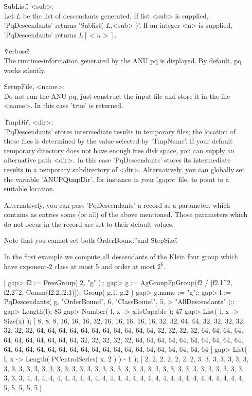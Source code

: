 \"SubList\", <sub>: \\
    Let $L$  be  the  list of  descendants  generated.  If  list <sub> is
    supplied,  'PqDescendants'  returns  'Sublist( $L$,<sub> )'.  If   an
    integer <n> is supplied, 'PqDescendants' returns $L[<n>]$.

\"Verbose\": \\
    The runtime-information  generated by  the  ANU pq is  displayed.  By
    default, pq works silently.

\"SetupFile\", <name>: \\
    Do not run the ANU pq, just construct  the input file and store it in
    the file <name>. In this case 'true' is returned.

\"TmpDir\", <dir>: \\
    'PqDescendants' stores intermediate results  in temporary  files; the
    location  of  these  files  is  determined  by the value  selected by
    'TmpName'.  If your default temporary directory does not  have enough
    free disk space,  you can supply an alternative path  <dir>.  In this
    case 'PqDescendants' stores its intermediate results  in  a temporary
    subdirectory of <dir>.
    Alternatively, you can globally set  the  variable 'ANUPQtmpDir', for
    instance in your \".gaprc\"\ file, to point to a suitable location.

Alternatively,  you can pass 'PqDescendants'  a record  as  a  parameter,
which  contains  as  entries some (or all) of the above mentioned.  Those
parameters  which do not occur  in  the record are  set  to their default
values.

Note that you cannot set both \"OrderBound\"\ and \"StepSize\".

In the first example  we  compute all descendants of the Klein four group
which have exponent-2 class at most 5 and order at most $2^6$.

|    gap> f2 := FreeGroup( 2, "g" );;
    gap> g := AgGroupFpGroup(f2 / [f2.1^2, f2.2^2, Comm(f2.2,f2.1)]);
    Group( g.1, g.2 )
    gap> g.name := "g";;
    gap> l := PqDescendants( g, "OrderBound", 6, "ClassBound", 5,
    >                        "AllDescendants" );;
    gap> Length(l);
    83
    gap> Number( l, x -> x.isCapable );
    47
    gap> List( l, x -> Size(x) );
    [ 8, 8, 8, 16, 16, 16, 32, 16, 16, 16, 16, 16, 32, 32, 64, 64, 32,
      32, 32, 32, 32, 32, 32, 64, 64, 64, 64, 64, 64, 64, 64, 64, 64, 64,
      32, 32, 32, 32, 64, 64, 64, 64, 64, 64, 64, 64, 64, 64, 64, 32, 32,
      32, 32, 32, 64, 64, 64, 64, 64, 64, 64, 64, 64, 64, 64, 64, 64, 64,
      64, 64, 64, 64, 64, 64, 64, 64, 64, 64, 64, 64, 64, 64, 64 ]
    gap> List( l, x -> Length( PCentralSeries( x, 2 ) ) - 1 );
    [ 2, 2, 2, 2, 2, 2, 2, 3, 3, 3, 3, 3, 3, 3, 3, 3, 3, 3, 3, 3, 3, 3,
      3, 3, 3, 3, 3, 3, 3, 3, 3, 3, 3, 3, 3, 3, 3, 3, 3, 3, 3, 3, 3, 3,
      3, 3, 3, 3, 3, 4, 4, 4, 4, 4, 4, 4, 4, 4, 4, 4, 4, 4, 4, 4, 4, 4,
      4, 4, 4, 4, 4, 4, 4, 4, 4, 4, 4, 4, 5, 5, 5, 5, 5 ] |

